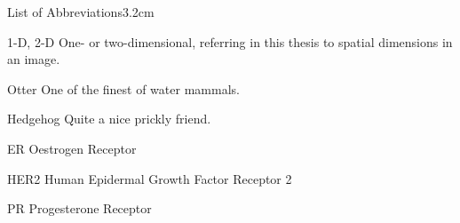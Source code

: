 \begin{mclistof}{List of Abbreviations}{3.2cm}

\item[1-D, 2-D] One- or two-dimensional, referring in this thesis to spatial dimensions in an image.

\item[Otter] One of the finest of water mammals.

\item[Hedgehog] Quite a nice prickly friend.

\item[ER]	Oestrogen Receptor

\item[HER2]	Human Epidermal Growth Factor Receptor 2

\item[PR]	Progesterone Receptor



\end{mclistof} 
